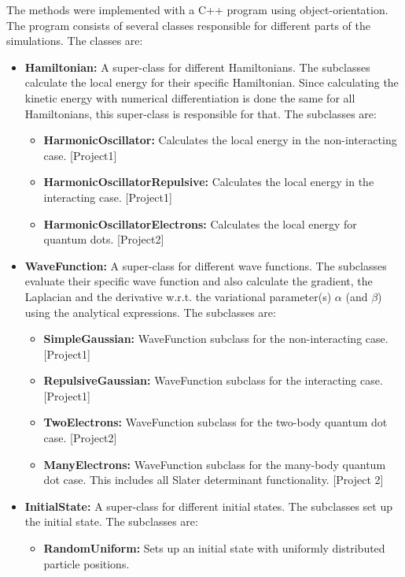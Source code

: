 \documentclass[../main.tex]{subfiles}
\begin{document}
\begin{appendices}
The methods were implemented with a C++ program using object-orientation. 
The program consists of several classes responsible for different parts of the simulations. The classes are:
\begin{itemize}
    \item {\bf Hamiltonian:} A super-class for different Hamiltonians. The subclasses calculate the local energy for their specific Hamiltonian. Since calculating the kinetic energy with numerical differentiation is done the same for all Hamiltonians, this super-class is responsible for that. The subclasses are:
    \begin{itemize}
        \item {\bf HarmonicOscillator:} Calculates the local energy in the non-interacting case. [Project1]
        \item {\bf HarmonicOscillatorRepulsive:} Calculates the local energy in the interacting case. [Project1]
        \item \textbf{HarmonicOscillatorElectrons:} Calculates the local energy for quantum dots. [Project2]
    \end{itemize}
    \item {\bf WaveFunction:} A super-class for different wave functions. The subclasses evaluate their specific wave function and also calculate the gradient, the Laplacian and the derivative w.r.t. the variational parameter(s) $\alpha$ (and $\beta$) using the analytical expressions. The subclasses are:
    \begin{itemize}
        \item {\bf SimpleGaussian:} WaveFunction subclass for the non-interacting case. [Project1]
        \item {\bf RepulsiveGaussian:} WaveFunction subclass for the interacting case. [Project1]
        \item \textbf{TwoElectrons:} WaveFunction subclass for the two-body quantum dot case. [Project2]
        \item \textbf{ManyElectrons:} WaveFunction subclass for the many-body quantum dot case. This includes all Slater determinant functionality. [Project 2]
    \end{itemize}
    \item {\bf InitialState:} A super-class for different initial states. The subclasses set up the initial state. The subclasses are:
    \begin{itemize}
        \item {\bf RandomUniform:} Sets up an initial state with uniformly distributed particle positions.

\end{itemize}
\end{itemize}
\end{appendices}
\end{document}
